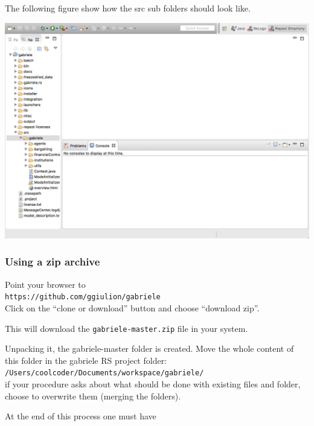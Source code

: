 \documentclass{book}
\begin{document}
The following figure show how the src sub folders should look like.

\noindent
\includegraphics[scale=0.35]{fig_gabriele_rs_navigation1}


\subsubsection{Using a zip archive}

Point your browser to\\ 
\verb+https://github.com/ggiulion/gabriele+\\
Click on the ``clone or download'' button and choose ``download zip''.

This will download the \verb+gabriele-master.zip+ file in your system.

Unpacking it, the gabriele-master folder is created.
Move the whole content of this folder in the gabriele RS project folder:\\  
\verb+/Users/coolcoder/Documents/workspace/gabriele/+\\
if your procedure asks about what should be done with existing files and folder, choose to overwrite them (merging the folders). 

\iffalse
At the end of this process one must have
\end{document}

